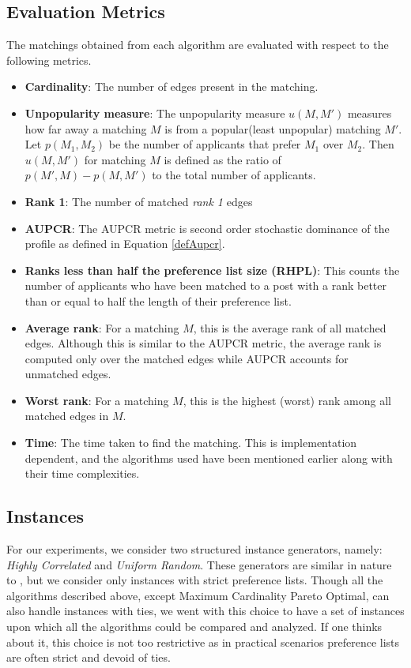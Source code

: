 \documentclass[letterpaper]{article} %
\begin{document}
\subsection{Evaluation Metrics}
The matchings obtained from each algorithm are evaluated with respect to the following metrics.
\begin{itemize}
\item \textbf{Cardinality}: The number of edges present in the matching.
\item \textbf{Unpopularity measure}: The unpopularity measure $u(M, M')$ measures how far away a matching $M$ is from a popular(least unpopular) matching $M'$. Let $p(M_1,M_2)$ be the number of applicants that prefer $M_1$ over $M_2$.  Then $u(M,M')$ for matching $M$ is defined as the ratio of $p(M',M) - p(M,M')$ to the total number of applicants.
\item \textbf{Rank 1}: The number of matched \textit{rank 1} edges
\item \textbf{AUPCR}: The AUPCR metric is second order stochastic dominance of the profile as defined in Equation \ref{defAupcr}.
\item \textbf{Ranks less than half the preference list size (RHPL)}: This counts the number of applicants who have been matched to a post with a rank better than or equal to half the length of their preference list.
\item \textbf{Average rank}: For a matching $M$, this is the average rank of all matched edges. Although this is similar to the AUPCR metric, the average rank is computed only over the matched edges while AUPCR accounts for unmatched edges.
\item \textbf{Worst rank}: For a matching $M$, this is the highest (worst) rank among all matched edges in $M$.
\item \textbf{Time}: The time taken to find the matching. This is implementation dependent, and the algorithms used have been mentioned earlier along with their time complexities.
\end{itemize}

\subsection{Instances}
For our experiments, we consider two structured instance generators, namely: \textit{Highly Correlated} and \textit{Uniform Random}. These generators are similar in nature to \cite{experimental}, but we consider only instances with strict preference lists. Though all the algorithms described above, except Maximum Cardinality Pareto Optimal, can also handle instances with ties, we went with this choice to have a set of instances upon which all the algorithms could be compared and analyzed. If one thinks about it, this choice is not too restrictive as in practical scenarios preference lists are often strict and devoid of ties.
\end{document}
